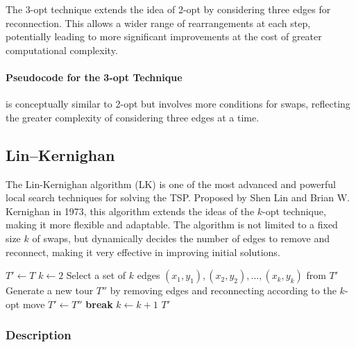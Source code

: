 The 3-opt technique extends the idea of 2-opt by considering three edges for reconnection. This allows a wider range of rearrangements at each step, potentially leading to more significant improvements at the cost of greater computational complexity.

\paragraph{Pseudocode for the 3-opt Technique} is conceptually similar to 2-opt but involves more conditions for swaps, reflecting the greater complexity of considering three edges at a time.

\subsection{Lin–Kernighan}

The Lin-Kernighan algorithm (\Gls{LK}) is one of the most advanced and powerful local search techniques for solving the \Gls{TSP}. Proposed by Shen Lin and Brian W. Kernighan in 1973, this algorithm extends the ideas of the \(k\)-opt technique, making it more flexible and adaptable. The algorithm is not limited to a fixed size \(k\) of swaps, but dynamically decides the number of edges to remove and reconnect, making it very effective in improving initial solutions.\cite{lin1973effective}


\begin{algorithm}
	\caption{Lin-Kernighan Algorithm for the \Gls{TSP}}\label{alg:lin-kernighan}
	\begin{algorithmic}[1]
		 
		\State $T' \gets T$ 
		\Repeat
		\State $k \gets 2$
		\Repeat
		\State Select a set of $k$ edges $(x_1, y_1), (x_2, y_2), \ldots, (x_k, y_k)$ from $T'$
		\State Generate a new tour $T''$ by removing edges and reconnecting according to the $k$-opt move
		\State $T' \gets T''$
		\State \textbf{break} 
		\EndIf
		\State $k \gets k + 1$
		\EndFor
		\State \Return $T'$
		\EndProcedure
	\end{algorithmic}
\end{algorithm}
\subsubsection{Description}

